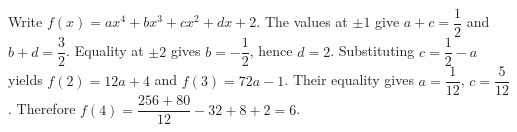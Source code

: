 Write $f(x)=ax^4+bx^3+cx^2+dx+2$. The values at $\pm1$ give $a+c=\dfrac{1}{2}$ and $b+d=\dfrac{3}{2}$. Equality at $\pm2$ gives $b=-\dfrac{1}{2}$, hence $d=2$. Substituting $c=\dfrac{1}{2}-a$ yields $f(2)=12a+4$ and $f(3)=72a-1$. Their equality gives $a=\dfrac{1}{12}$, $c=\dfrac{5}{12}$. Therefore $f(4)=\dfrac{256+80}{12}-32+8+2=\boxed6$.
